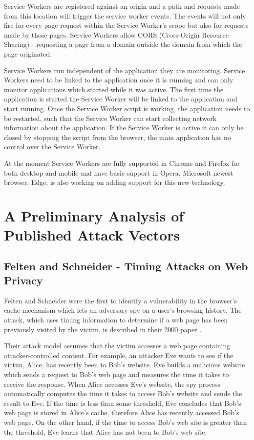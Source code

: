 \documentclass[10pt,a4paper,twoside]{book}
\begin{document}
Service Workers are registered against an origin and a path and requests made from this location will trigger the service worker events. The events will not only fire for every page request within the Service Worker's scope but also for requests made by those pages. Service Workers allow CORS (Cross-Origin Resource Sharing) - requesting a page from a domain outside the domain from which the page originated.

Service Workers run independent of the application they are monitoring. Service Workers need to be linked to the application once it is running and can only monitor applications which started while it was active. The first time the application is started the Service Worker will be linked to the application and start running. Once the Service Worker script is working, the application needs to be restarted, such that the Service Worker can start collecting network information about the application. If the Service Worker is active it can only be closed by stopping the script from the browser, the main application has no control over the Service Worker.

At the moment Service Workers are fully supported in Chrome and Firefox for both desktop and mobile and have basic support in Opera. Microsoft newest browser, Edge, is also working on adding support for this new technology.



\chapter{A Preliminary Analysis of Published Attack Vectors}
\label{chap:realtedWork}

\section{Felten and Schneider - Timing Attacks on Web Privacy}
\label{feltenschneider}
Felten and Schneider were the first to identify a vulnerability in the browser's cache mechanism which lets an adversary spy on a user's browsing history. The attack, which uses timing information to determine if a web page has been previously visited by the victim, is described in their 2000 paper \cite{felten2000timing}.

Their attack model assumes that the victim accesses a web page containing attacker-controlled content. For example, an attacker Eve wants to see if the victim, Alice, has recently been to Bob's website. Eve builds a malicious website which sends a request to Bob's web page and measures the time it takes to receive the response. When Alice accesses Eve's website, the spy process automatically computes the time it takes to access Bob's website and sends the result to Eve. If the time is less than some threshold, Eve concludes that Bob's web page is stored in Alice's cache, therefore Alice has recently accessed Bob's web page. On the other hand, if the time to access Bob's web site is greater than the threshold, Eve learns that Alice has not been to Bob's web site.
\end{document}
